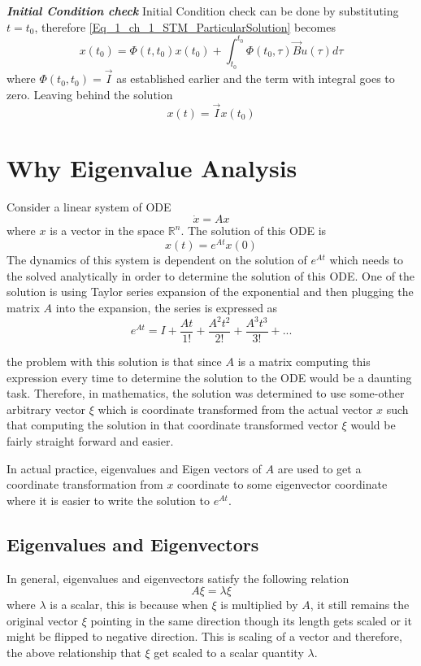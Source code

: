 \textbf{\textit{Initial Condition check}}
Initial Condition check can be done by substituting $t = t_{0}$, therefore \eqref{Eq_1_ch_1_STM_ParticularSolution} becomes
\begin{equation} 
x(t_{0}) = \Phi(t, t_{0}) x(t_{0}) + \int_{t_{0}}^{t_{0}} \Phi(t_{0}, \tau) \vec{B}u(\tau)d\tau
\end{equation}
where $\Phi(t_{0}, t_{0}) = \vec{I}$ as established earlier and the term with integral goes to zero. Leaving behind the solution
\begin{equation} 
x(t) = \vec{I} x(t_{0})
\end{equation}

\section{Why Eigenvalue Analysis}

Consider a linear system of ODE $$\dot{x} = Ax$$ where $x$ is a vector in the space $\mathbb{R}^{n}$. The solution of this ODE is $$x(t) = e^{At}x(0)$$ The dynamics of this system is dependent on the solution of $e^{At}$ which needs to the solved analytically in order to determine the solution of this ODE. One of the solution is using Taylor series expansion of the exponential and then plugging the matrix $A$ into the expansion, the series is expressed as
\begin{equation}
	e^{At} = I + \frac{At}{1!} + \frac{A^{2}t^{2}}{2!} +  \frac{A^{3}t^{3}}{3!} + ...
\end{equation}

the problem with this solution is that since $A$ is a matrix computing this expression every time to determine the solution to the ODE would be a daunting task. Therefore, in mathematics, the solution was determined to use some-other arbitrary vector $\xi$ which is coordinate transformed from the actual vector $x$ such that computing the solution in that coordinate transformed vector $\xi$ would be fairly straight forward and easier.

In actual practice, eigenvalues and Eigen vectors of $A$ are used to get a coordinate transformation from $x$ coordinate to some eigenvector coordinate where it is easier to write the solution to $e^{At}$.

\subsection{Eigenvalues and Eigenvectors}

In general, eigenvalues and eigenvectors satisfy the following relation
\begin{equation}\label{eq_0_ch_0_ev_ev0}
	A \xi = \lambda \xi
\end{equation}
where $\lambda$ is a scalar, this is because when $\xi$ is multiplied by $A$, it still remains the original vector $\xi$ pointing in the same direction though its length gets scaled or it might be flipped to negative direction. This is scaling of a vector and therefore, the above relationship that $\xi$ get scaled to a scalar quantity $\lambda$. 

